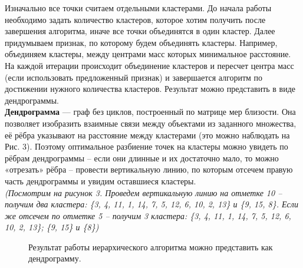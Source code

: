 \documentclass[12pt, a4paper]{article}
\begin{document}
Изначально все точки считаем отдельными кластерами. До начала работы необходимо задать количество кластеров, которое хотим получить после завершения алгоритма, иначе все точки объединятся в один кластер. Далее придумываем признак, по которому будем объединять кластеры. Например, объединяем кластеры, между центрами масс которых минимальное расстояние.
 На каждой итерации происходит объединение кластеров и пересчет центра масс (если использовать предложенный признак) и завершается алгоритм по достижении нужного количества кластеров. Результат можно представить в виде дендрограммы. \\\textbf{Дендрограмма} --- граф без циклов, построенный по матрице мер близости. Она позволяет изобразить взаимные связи между объектами из заданного множества, её рёбра указывают на расстояние между кластерами (это можно наблюдать на Рис. 3). Поэтому оптимальное разбиение точек на кластеры можно увидеть по рёбрам дендрограммы -- если они длинные и их достаточно мало, то можно «отрезать» рёбра -- провести вертикальную линию, по которым отсечем правую часть дендрограммы и увидим оставшиеся кластеры. \\\textit{(Посмотрим на рисунок 3. Проведем вертикальную линию на отметке 10 -- получим два кластера: \{3, 4, 11, 1, 14, 7, 5, 12, 6, 10, 2, 13\} и \{9, 15, 8\}. Если же отсечем по отметке 5 -- получим 3 кластера: \{3, 4, 11, 1, 14, 7, 5, 12, 6, 10, 2, 13\}; \{9, 15\} и \{8\})}
 \begin{figure}[h!]
\caption{Результат работы иерархического алгоритма можно представить как дендрограмму.}
\label{fig:dbscan}
\end{figure}
\end{document}

